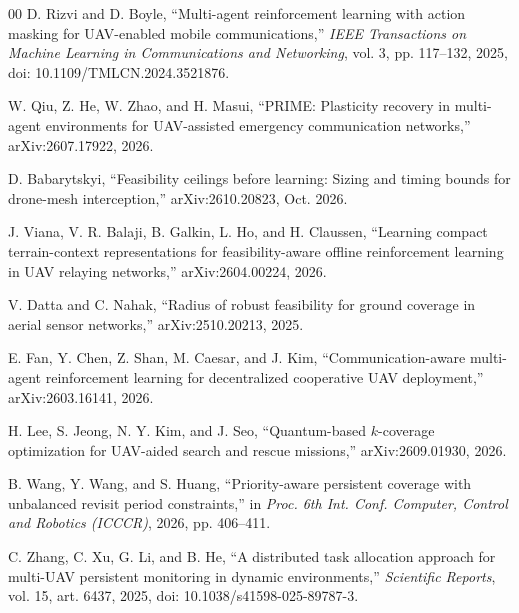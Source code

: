 \documentclass[conference]{IEEEtran}
\begin{document}
\begin{thebibliography}{00}
D. Rizvi and D. Boyle, ``Multi-agent reinforcement learning with action masking for UAV-enabled mobile communications,'' \emph{IEEE Transactions on Machine Learning in Communications and Networking}, vol. 3, pp. 117--132, 2025, doi: 10.1109/TMLCN.2024.3521876.

W. Qiu, Z. He, W. Zhao, and H. Masui, ``PRIME: Plasticity recovery in multi-agent environments for UAV-assisted emergency communication networks,'' arXiv:2607.17922, 2026.

D. Babarytskyi, ``Feasibility ceilings before learning: Sizing and timing bounds for drone-mesh interception,'' arXiv:2610.20823, Oct. 2026.

J. Viana, V. R. Balaji, B. Galkin, L. Ho, and H. Claussen, ``Learning compact terrain-context representations for feasibility-aware offline reinforcement learning in UAV relaying networks,'' arXiv:2604.00224, 2026.

V. Datta and C. Nahak, ``Radius of robust feasibility for ground coverage in aerial sensor networks,'' arXiv:2510.20213, 2025.

E. Fan, Y. Chen, Z. Shan, M. Caesar, and J. Kim, ``Communication-aware multi-agent reinforcement learning for decentralized cooperative UAV deployment,'' arXiv:2603.16141, 2026.

H. Lee, S. Jeong, N. Y. Kim, and J. Seo, ``Quantum-based $k$-coverage optimization for UAV-aided search and rescue missions,'' arXiv:2609.01930, 2026.

B. Wang, Y. Wang, and S. Huang, ``Priority-aware persistent coverage with unbalanced revisit period constraints,'' in \emph{Proc. 6th Int. Conf. Computer, Control and Robotics (ICCCR)}, 2026, pp. 406--411.

C. Zhang, C. Xu, G. Li, and B. He, ``A distributed task allocation approach for multi-UAV persistent monitoring in dynamic environments,'' \emph{Scientific Reports}, vol. 15, art. 6437, 2025, doi: 10.1038/s41598-025-89787-3.

\end{thebibliography}
\end{document}
